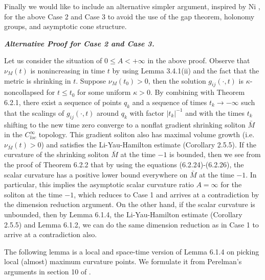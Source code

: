 Finally we would like to include an alternative simpler argument,
inspired by Ni \cite{Ni}, for the above Case 2 and Case 3 to avoid
the use of the gap theorem, holonomy groups, and asymptotic cone
structure.

\medskip
{\bf \em Alternative Proof for Case {\bf 2} and Case {\bf 3}.}

Let us consider the situation of $0 \leq A < +\infty$ in the above
proof. Observe that $\nu_M(t)$ is nonincreasing in time $t$ by
using Lemma 3.4.1(ii) and the fact that the metric is shrinking in
$t$. Suppose $\nu_M(t_0)>0$, then the solution $g_{ij}(\cdot,t)$
is $\kappa$-noncollapsed for $t\leq t_0$ for some uniform
$\kappa>0$. By combining with Theorem 6.2.1, there exist a
sequence of points $q_k$ and a sequence of times $t_k \rightarrow
-\infty$ such that the scalings of $g_{ij}(\cdot,t)$ around $q_k$
with factor $|t_k|^{-1}$ and with the times $t_k$ shifting to the
new time zero converge to a nonflat gradient shrinking soliton
$\bar{M}$ in the $C_{loc}^\infty$ topology. This gradient soliton
also has maximal volume growth (i.e. $\nu_{\bar{M}}(t)>0$) and
satisfies the Li-Yau-Hamilton estimate (Corollary 2.5.5). If the
curvature of the shrinking soliton $\bar{M}$ at the time $-1$ is
bounded, then we see from the proof of Theorem 6.2.2 that by using
the equations (6.2.24)-(6.2.26), the scalar curvature has a
positive lower bound everywhere on $\bar{M}$ at the time $-1$. In
particular, this implies the asymptotic scalar curvature ratio
$A=\infty$ for the soliton at the time $-1$, which reduces to Case
1 and arrives at a contradiction by the dimension reduction
argument. On the other hand, if the scalar curvature is unbounded,
then by Lemma 6.1.4, the Li-Yau-Hamilton estimate (Corollary
2.5.5) and Lemma 6.1.2, we can do the same dimension reduction as
in Case 1 to arrive at a contradiction also.
\endproof

The following lemma is a local and space-time version of Lemma
6.1.4 on picking local (almost) maximum curvature points. We
formulate it from Perelman's arguments in section 10 of \cite{P1}.

